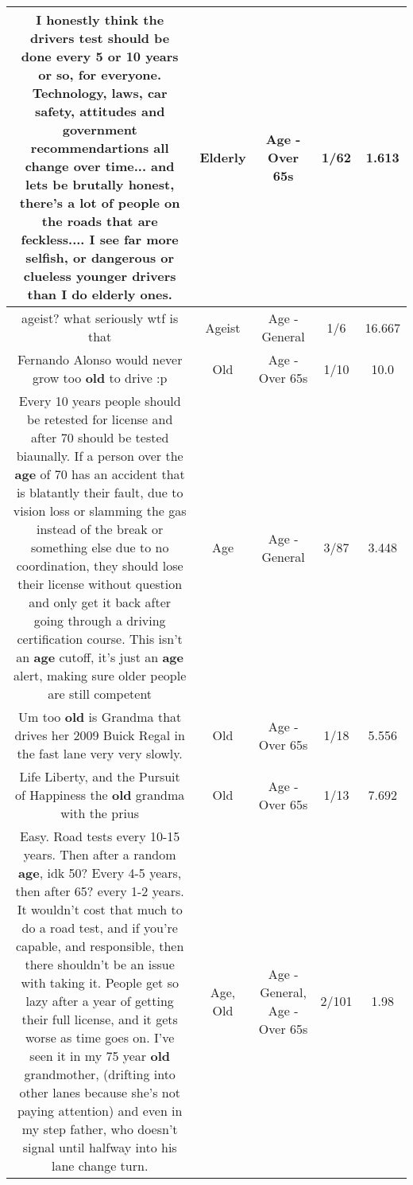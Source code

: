 \documentclass[11pt]{article}
\newlength\mylength
\begin{document}
\begin{center}
\begin{longtable}{|C{.65\mylength}|C{.30\mylength}|C{.12\mylength}|C{.12\mylength}|C{.12\mylength}|}
  \small I honestly think the drivers test should be done every 5 or 10 years or so, for everyone. Technology, laws, car safety, attitudes and government recommendartions all change over time... and lets be brutally honest, there's a lot of people on the roads that are feckless.... I see far more selfish, or dangerous or clueless younger drivers than I do \textbf{elderly} ones.\normalsize   & Elderly & Age - Over 65s & 1/62 & 1.613 \\  \hline
  \small ageist? what seriously wtf is that\normalsize   & Ageist & Age - General & 1/6 & 16.667 \\  \hline
  \small Fernando Alonso would never grow too \textbf{old} to drive :p\normalsize   & Old & Age - Over 65s & 1/10 & 10.0 \\  \hline
  \small Every 10 years people should be retested for license and after 70 should be tested biaunally. If a person over the \textbf{age} of 70 has an accident that is blatantly their fault, due to vision loss or slamming the gas instead of the break or something else due to no coordination, they should lose their license without question and only get it back after going through a driving certification course. This isn't an \textbf{age} cutoff, it's just an \textbf{age} alert, making sure older people are still competent\normalsize   & Age & Age - General & 3/87 & 3.448 \\  \hline
  \small Um too \textbf{old} is Grandma that drives her 2009 Buick Regal in the fast lane very very slowly.\normalsize   & Old & Age - Over 65s & 1/18 & 5.556 \\  \hline
  \small Life Liberty, and the Pursuit of Happiness the \textbf{old} grandma with the prius\normalsize   & Old & Age - Over 65s & 1/13 & 7.692 \\  \hline
  \small Easy. Road tests every 10-15 years. Then after a random \textbf{age}, idk 50? Every 4-5 years, then after 65? every 1-2 years. It wouldn't cost that much to do a road test, and if you're capable, and responsible, then there shouldn't be an issue with taking it. People get so lazy after a year of getting their full license, and it gets worse as time goes on. I've seen it in my 75 year \textbf{old} grandmother, (drifting into other lanes because she's not paying attention) and even in my step father, who doesn't signal until halfway into his lane change turn.\normalsize   & Age, Old & Age - General, Age - Over 65s & 2/101 & 1.98 \\  \hline

\end{longtable}
\end{center}
\end{document}
